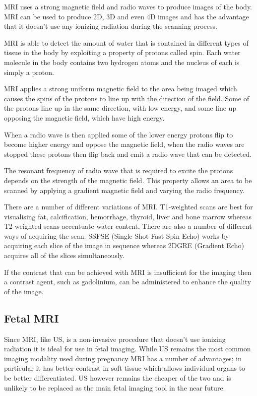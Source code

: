 MRI uses a strong magnetic field and radio waves to produce images of the body. MRI can be used to produce 2D, 3D and even 4D images and has the advantage that it doesn’t use any ionizing radiation during the scanning process.

MRI is able to detect the amount of water that is contained in different types of tissue in the body by exploiting a property of protons called spin. Each water molecule in the body contains two hydrogen atoms and the nucleus of each is simply a proton.

MRI applies a strong uniform magnetic field to the area being imaged which causes the spins of the protons to line up with the direction of the field. Some of the protons line up in the same direction, with low energy, and some line up opposing the magnetic field, which have high energy.

When a radio wave is then applied some of the lower energy protons flip to become higher energy and oppose the magnetic field, when the radio waves are stopped these protons then flip back and emit a radio wave that can be detected.

The resonant frequency of radio wave that is required to excite the protons depends on the strength of the magnetic field. This property allows an area to be scanned by applying a gradient magnetic field and varying the radio frequency.

There are a number of different variations of MRI. T1-weighted scans are best for visualising fat, calcification, hemorrhage, thyroid, liver and bone marrow whereas T2-weighted scans accentuate water content.
There are also a number of different ways of acquiring the scan. SSFSE (Single Shot Fast Spin Echo) works by acquiring each slice of the image in sequence whereas 2DGRE (Gradient Echo) acquires all of the slices simultaneously.

If the contrast that can be achieved with MRI is insufficient for the imaging then a contrast agent, such as gadolinium, can be administered to enhance the quality of the image.

\subsection{Fetal MRI}\cite{fetalmri}

Since MRI, like US, is a non-invasive procedure that doesn’t use ionizing radiation it is ideal for use in fetal imaging. While US remains the most common imaging modality used during pregnancy MRI has a number of advantages; in particular it has better contrast in soft tissue which allows individual organs to be better differentiated. US however remains the cheaper of the two and is unlikely to be replaced as the main fetal imaging tool in the near future.

